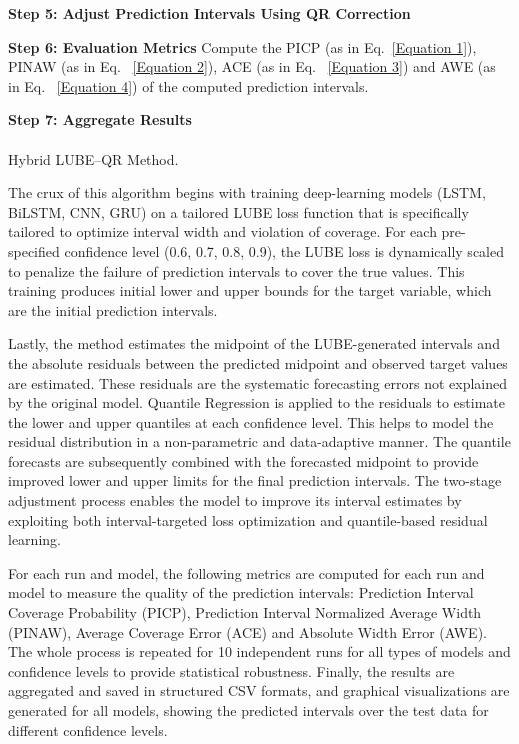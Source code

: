 \begin{algorithm}
    \textbf{Step 5: Adjust Prediction Intervals Using QR Correction}\\

    \textbf{Step 6: Evaluation Metrics} Compute the PICP (as in Eq.~\eqref{Equation 1}), PINAW (as in Eq. ~\eqref{Equation 2}), ACE (as in Eq. ~\eqref{Equation 3}) and AWE (as in Eq. ~\eqref{Equation 4}) of the computed prediction intervals.

    
    \textbf{Step 7: Aggregate Results}\\
    \\
    
    \caption{Hybrid LUBE–QR Method.}
\end{algorithm}

The crux of this algorithm begins with training deep-learning models (LSTM, BiLSTM, CNN, GRU) on a tailored LUBE loss function that is specifically tailored to optimize interval width and violation of coverage. For each pre-specified confidence level (0.6, 0.7, 0.8, 0.9), the LUBE loss is dynamically scaled to penalize the failure of prediction intervals to cover the true values. This training produces initial lower and upper bounds for the target variable, which are the initial prediction intervals.

Lastly, the method estimates the midpoint of the LUBE-generated intervals and the absolute residuals between the predicted midpoint and observed target values are estimated. These residuals are the systematic forecasting errors not explained by the original model. Quantile Regression is applied to the residuals to estimate the lower and upper quantiles at each confidence level. This helps to model the residual distribution in a non-parametric and data-adaptive manner. The quantile forecasts are subsequently combined with the forecasted midpoint to provide improved lower and upper limits for the final prediction intervals. The two-stage adjustment process enables the model to improve its interval estimates by exploiting both interval-targeted loss optimization and quantile-based residual learning.

For each run and model, the following metrics are computed for each run and model to measure the quality of the prediction intervals: Prediction Interval Coverage Probability (PICP), Prediction Interval Normalized Average Width (PINAW), Average Coverage Error (ACE) and Absolute Width Error (AWE). The whole process is repeated for 10 independent runs for all types of models and confidence levels to provide statistical robustness. Finally, the results are aggregated and saved in structured CSV formats, and graphical visualizations are generated for all models, showing the predicted intervals over the test data for different confidence levels.

